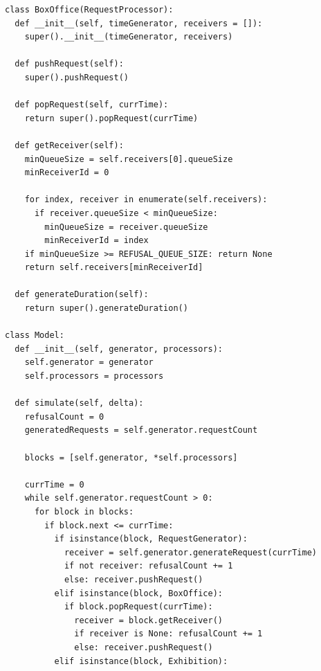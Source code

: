 \documentclass[12pt]{report}
\begin{document}
\clearpage
\begin{lstlisting}
class BoxOffice(RequestProcessor):
  def __init__(self, timeGenerator, receivers = []):
    super().__init__(timeGenerator, receivers)

  def pushRequest(self):
    super().pushRequest()

  def popRequest(self, currTime):
    return super().popRequest(currTime)
  
  def getReceiver(self):
    minQueueSize = self.receivers[0].queueSize
    minReceiverId = 0
    
    for index, receiver in enumerate(self.receivers):
      if receiver.queueSize < minQueueSize:
        minQueueSize = receiver.queueSize
        minReceiverId = index
    if minQueueSize >= REFUSAL_QUEUE_SIZE: return None
    return self.receivers[minReceiverId]
  
  def generateDuration(self):
    return super().generateDuration()

class Model:
  def __init__(self, generator, processors):
    self.generator = generator
    self.processors = processors

  def simulate(self, delta):
    refusalCount = 0
    generatedRequests = self.generator.requestCount
    
    blocks = [self.generator, *self.processors]

    currTime = 0
    while self.generator.requestCount > 0:
      for block in blocks:
        if block.next <= currTime:
          if isinstance(block, RequestGenerator):
            receiver = self.generator.generateRequest(currTime)
            if not receiver: refusalCount += 1
            else: receiver.pushRequest()
          elif isinstance(block, BoxOffice):
            if block.popRequest(currTime):
              receiver = block.getReceiver()
              if receiver is None: refusalCount += 1
              else: receiver.pushRequest()
          elif isinstance(block, Exhibition):
\end{lstlisting}
\end{document}
